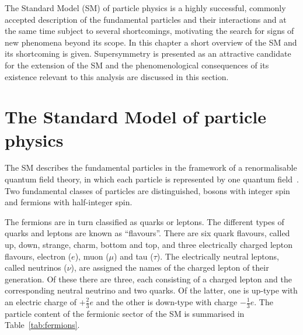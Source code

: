 The Standard Model (SM) of particle physics is a highly successful, commonly accepted description of the fundamental particles and their interactions and at the same time subject to several shortcomings, motivating the search for signs of new phenomena beyond its scope. In this chapter a short overview of the SM and its shortcoming is given. Supersymmetry is presented as an attractive candidate for the extension of the SM and the phenomenological consequences of its existence relevant to this analysis are discussed in this section. 
\label{sec:theo}
\section{The Standard Model of particle physics}
The SM describes the fundamental particles in the framework of a renormalisable quantum field theory, in which each particle is represented by one quantum field~\cite{Glashow1961579,Salam1964168,PhysRevLett.19.1264,PhysRevD.5.1412}. Two fundamental classes of particles are distinguished, bosons with integer spin and fermions with half-integer spin. 

The fermions are in turn classified as quarks or leptons. The different types of quarks and leptons are known as ``flavours''. There are six quark flavours, called up, down, strange, charm, bottom and top, and three electrically charged lepton flavours, electron ($e$), muon ($\mu$) and tau ($\tau$). The electrically neutral leptons, called neutrinos ($\nu$), are assigned the names of the charged lepton of their generation. Of these there are three, each consisting of a charged lepton and the corresponding neutral neutrino and two quarks. Of the latter, one is up-type with an electric charge of $+\frac{2}{3}e$ and the other is down-type with charge $-\frac{1}{3}e$. The particle content of the fermionic sector of the SM is summarised in Table~\ref{tab:fermions}.

